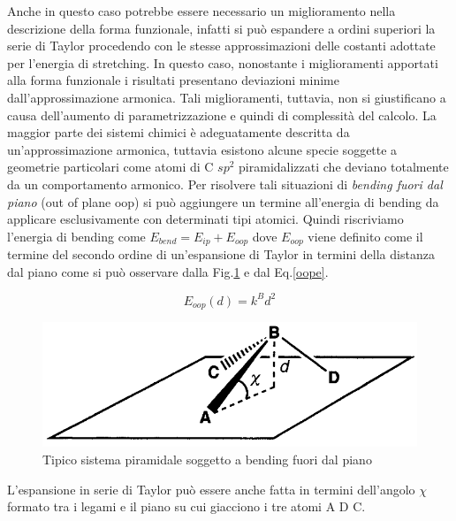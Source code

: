 \documentclass[oneside]{amsbook}
\numberwithin{section}{chapter}
\numberwithin{equation}{section}
\numberwithin{figure}{section}
\begin{document}
Anche in questo caso potrebbe essere necessario un miglioramento nella descrizione della forma funzionale, infatti si può espandere a ordini superiori la serie di Taylor procedendo con le stesse approssimazioni delle costanti adottate per l'energia di stretching. In questo caso, nonostante i miglioramenti apportati alla forma funzionale i risultati presentano deviazioni minime dall'approssimazione armonica. Tali miglioramenti, tuttavia, non si giustificano a causa dell'aumento di parametrizzazione e quindi di complessità del calcolo.
La maggior parte dei sistemi chimici è adeguatamente descritta da un'approssimazione armonica, tuttavia esistono alcune specie soggette a geometrie particolari come atomi di C $sp^2$ piramidalizzati che deviano totalmente da un comportamento armonico. Per risolvere tali situazioni di \emph{bending fuori dal piano} (out of plane oop) si può aggiungere un termine all'energia di bending da applicare esclusivamente con determinati tipi atomici. Quindi riscriviamo l'energia di bending come $ E_{bend}=E_{ip}+E_{oop}$ dove $E_{oop}$ viene definito come il termine del secondo ordine di un'espansione di Taylor in termini della distanza dal piano come si può osservare dalla Fig.\ref{oopf} e dal Eq.\ref{oope}.

\begin{equation}
\label{oope}
E_{oop}(d)= k^Bd^2
\end{equation}

\begin{figure} 
\label{oopf}
\centering
\caption{Tipico sistema piramidale soggetto a bending fuori dal piano}
\includegraphics[scale=0.4]{oop}
\end{figure}
L'espansione in serie di Taylor può essere anche fatta in termini dell'angolo $\chi$ formato tra i legami e il piano su cui giacciono i tre atomi A D C. 
\end{document}
